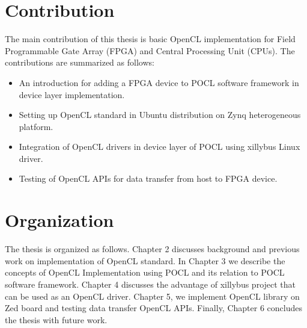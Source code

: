 \section{Contribution}
The main contribution of this thesis is basic OpenCL implementation for Field Programmable Gate Array (FPGA) and Central Processing Unit (CPUs). The contributions are summarized as follows:
\begin{itemize} 
	\item An introduction for adding a FPGA device to POCL software framework in device layer implementation.
	\item Setting up OpenCL standard in Ubuntu distribution on Zynq heterogeneous platform.
	\item Integration of OpenCL drivers in device layer of POCL using xillybus Linux driver.
	\item Testing of OpenCL APIs for data transfer from host to FPGA device.
\end{itemize}

\section{Organization}
The thesis is organized as follows. Chapter 2 discusses background and previous work on implementation of OpenCL standard. In Chapter 3 we describe the concepts of OpenCL Implementation using POCL and its relation to POCL software framework. Chapter 4 discusses the advantage of xillybus project that can be used as an OpenCL driver. Chapter 5, we implement OpenCL library on Zed board and testing data transfer OpenCL APIs. Finally, Chapter 6 concludes the thesis with future work.